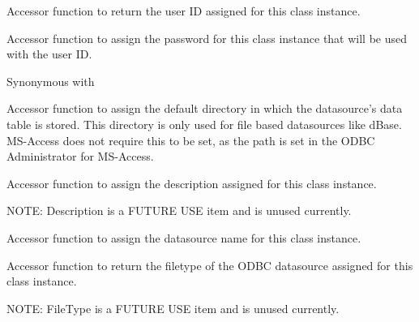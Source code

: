\label{wxdbconnectinfgetuserid}


Accessor function to return the user ID assigned for this class
instance.

\label{wxdbconnectinfsetauthstr}


Accessor function to assign the password for this class
instance that will be used with the user ID.

Synonymous with 

\label{wxdbconnectinfsetdefaultdir}


Accessor function to assign the default directory in which the datasource's data
table is stored.  This directory is only used for file based datasources like
dBase.  MS-Access does not require this to be set, as the path is set in the
ODBC Administrator for MS-Access.

\label{wxdbconnectinfsetdescription}


Accessor function to assign the description assigned for this class
instance.

NOTE: Description is a FUTURE USE item and is unused currently.

\label{wxdbconnectinfsetdsn}


Accessor function to assign the datasource name for this class instance.

\label{wxdbconnectinfsetfiletype}


Accessor function to return the filetype of the ODBC datasource assigned for
this class instance.

NOTE: FileType is a FUTURE USE item and is unused currently.

\label{wxdbconnectinfsethenv}

